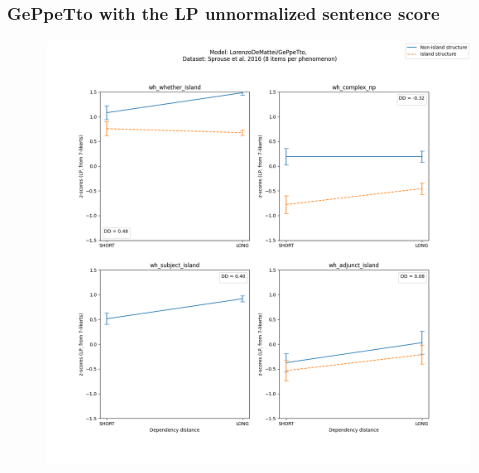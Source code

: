\subsubsection{GePpeTto with the LP unnormalized sentence score}
\begin{figure}[h]
	\centering
	\includegraphics[width=1\textwidth]{images/AppendixA/Sprouse_wh_LorenzoDeMattei_GePpeTto_LP-zscores-likert-2022-09-14_h17m23s51.png} 
	\label{A-fig:sprouse_gpt_lp}
	\caption{}
\end{figure}

\clearpage



